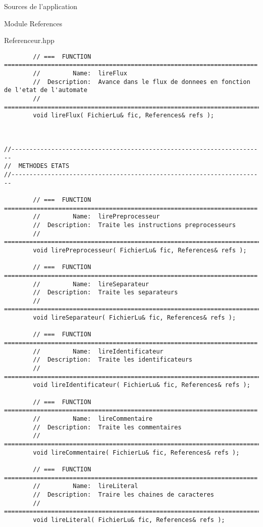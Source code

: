 \documentclass{article}
\begin{document}
\begin{section}{Sources de l'application}
\begin{subsection}{Module References}
\begin{paragraph}{Referenceur.hpp}
\begin{verbatim}
        // ===  FUNCTION  ======================================================================
        //         Name:  lireFlux
        //  Description:  Avance dans le flux de donnees en fonction de l'etat de l'automate
        // =====================================================================================
        void lireFlux( FichierLu& fic, References& refs );



//----------------------------------------------------------------------
//  METHODES ETATS
//----------------------------------------------------------------------

        // ===  FUNCTION  ======================================================================
        //         Name:  lirePreprocesseur
        //  Description:  Traite les instructions preprocesseurs
        // =====================================================================================
        void lirePreprocesseur( FichierLu& fic, References& refs );

        // ===  FUNCTION  ======================================================================
        //         Name:  lireSeparateur
        //  Description:  Traite les separateurs
        // =====================================================================================
        void lireSeparateur( FichierLu& fic, References& refs );

        // ===  FUNCTION  ======================================================================
        //         Name:  lireIdentificateur
        //  Description:  Traite les identificateurs
        // =====================================================================================
        void lireIdentificateur( FichierLu& fic, References& refs );

        // ===  FUNCTION  ======================================================================
        //         Name:  lireCommentaire
        //  Description:  Traite les commentaires
        // =====================================================================================
        void lireCommentaire( FichierLu& fic, References& refs );

        // ===  FUNCTION  ======================================================================
        //         Name:  lireLiteral
        //  Description:  Traire les chaines de caracteres
        // =====================================================================================
        void lireLiteral( FichierLu& fic, References& refs );



\end{verbatim}
\end{paragraph}
\end{subsection}
\end{section}
\end{document}
